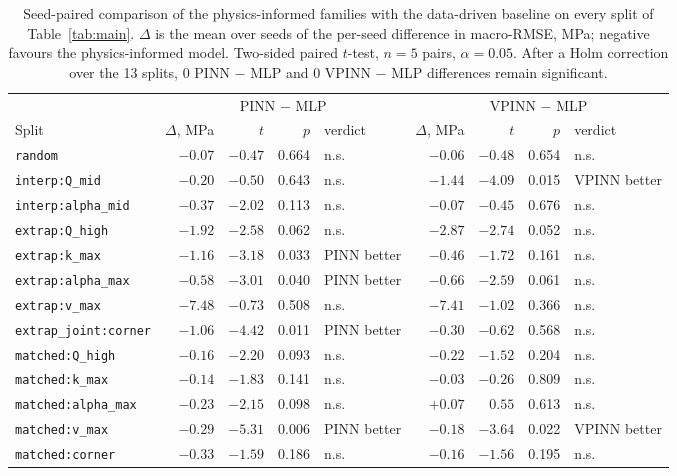 \documentclass[subscriptcorrection,upint,varvw,barcolor=Goldenrod3,mathalfa=cal=euler,balance,hyphenate,french,pdf-a]{asmejour} %
\begin{document}
\begin{table}[htbp]
\centering
\caption{Seed-paired comparison of the physics-informed families with the data-driven baseline on every split of Table~\ref{tab:main}. $\Delta$ is the mean over seeds of the per-seed difference in macro-RMSE, MPa; negative favours the physics-informed model. Two-sided paired $t$-test, $n = 5$ pairs, $\alpha = 0.05$. After a Holm correction over the 13 splits, 0 PINN $-$ MLP and 0 VPINN $-$ MLP differences remain significant.}
\label{tab:paired}
\small
\begin{tabular}{@{}lrrrlrrrl@{}}
\toprule
 & \multicolumn{4}{c}{PINN $-$ MLP} & \multicolumn{4}{c}{VPINN $-$ MLP} \\
\cmidrule(lr){2-5} \cmidrule(lr){6-9}
Split & $\Delta$, MPa & $t$ & $p$ & verdict & $\Delta$, MPa & $t$ & $p$ & verdict \\
\midrule
\texttt{random} & $-0.07$ & $-0.47$ & 0.664 & n.s. & $-0.06$ & $-0.48$ & 0.654 & n.s. \\
\addlinespace
\texttt{interp:Q\_mid} & $-0.20$ & $-0.50$ & 0.643 & n.s. & $-1.44$ & $-4.09$ & 0.015 & VPINN better \\
\texttt{interp:alpha\_mid} & $-0.37$ & $-2.02$ & 0.113 & n.s. & $-0.07$ & $-0.45$ & 0.676 & n.s. \\
\addlinespace
\texttt{extrap:Q\_high} & $-1.92$ & $-2.58$ & 0.062 & n.s. & $-2.87$ & $-2.74$ & 0.052 & n.s. \\
\texttt{extrap:k\_max} & $-1.16$ & $-3.18$ & 0.033 & PINN better & $-0.46$ & $-1.72$ & 0.161 & n.s. \\
\texttt{extrap:alpha\_max} & $-0.58$ & $-3.01$ & 0.040 & PINN better & $-0.66$ & $-2.59$ & 0.061 & n.s. \\
\texttt{extrap:v\_max} & $-7.48$ & $-0.73$ & 0.508 & n.s. & $-7.41$ & $-1.02$ & 0.366 & n.s. \\
\addlinespace
\texttt{extrap\_joint:corner} & $-1.06$ & $-4.42$ & 0.011 & PINN better & $-0.30$ & $-0.62$ & 0.568 & n.s. \\
\addlinespace
\texttt{matched:Q\_high} & $-0.16$ & $-2.20$ & 0.093 & n.s. & $-0.22$ & $-1.52$ & 0.204 & n.s. \\
\texttt{matched:k\_max} & $-0.14$ & $-1.83$ & 0.141 & n.s. & $-0.03$ & $-0.26$ & 0.809 & n.s. \\
\texttt{matched:alpha\_max} & $-0.23$ & $-2.15$ & 0.098 & n.s. & $+0.07$ & $0.55$ & 0.613 & n.s. \\
\texttt{matched:v\_max} & $-0.29$ & $-5.31$ & 0.006 & PINN better & $-0.18$ & $-3.64$ & 0.022 & VPINN better \\
\texttt{matched:corner} & $-0.33$ & $-1.59$ & 0.186 & n.s. & $-0.16$ & $-1.56$ & 0.195 & n.s. \\
\bottomrule
\end{tabular}
\end{table}
\end{document}
